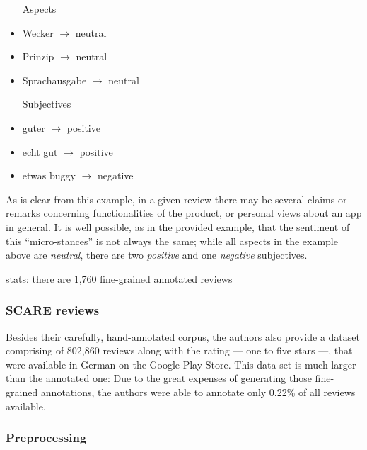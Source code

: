 \begin{multicols}{2}

\begin{itemize}
	\item [Aspects]
	\item Wecker $\rightarrow$ neutral
	\item Prinzip $\rightarrow$ neutral
	\item Sprachausgabe $\rightarrow$ neutral
\end{itemize}

\columnbreak

\begin{itemize}
	\item [Subjectives]
	\item guter $\rightarrow$ positive
	\item echt gut $\rightarrow$ positive
	\item etwas buggy $\rightarrow$ negative
\end{itemize}

\end{multicols}

As is clear from this example, in a given review there may be several claims or remarks concerning functionalities of the product, or personal views about an app in general.
It is well possible, as in the provided example, that the sentiment of this ``micro-stances'' is not always the same; while all aspects in the example above are \textit{neutral}, there are two \textit{positive} and one \textit{negative} subjectives.


stats: there are 1,760 fine-grained annotated reviews

\subsubsection{SCARE reviews}

Besides their carefully, hand-annotated corpus, the authors also provide a dataset comprising of 802,860 reviews along with the rating --- one to five stars ---, that were available in German on the Google Play Store.
This data set is much larger than the annotated one: Due to the great expenses of generating those fine-grained annotations, the authors were able to annotate only 0.22\% of all reviews available.



\subsubsection{Preprocessing}

